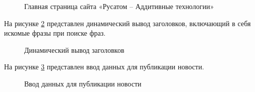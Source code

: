\begin{figure}[H]
\caption{Главная страница сайта «Русатом – Аддитивные технологии»}
\label{main:image}
\end{figure}

На рисунке \ref{menu:image} представлен динамический вывод заголовков, включающий в себя искомые фразы при поиске фраз.

\begin{figure}[H]
\caption{Динамический вывод заголовков}
\label{menu:image}
\end{figure}

На рисунке \ref{enter:image} представлен ввод данных для публикации новости.

\begin{figure}[H]
\caption{Ввод данных для публикации новости}
\label{enter:image}
\end{figure}

